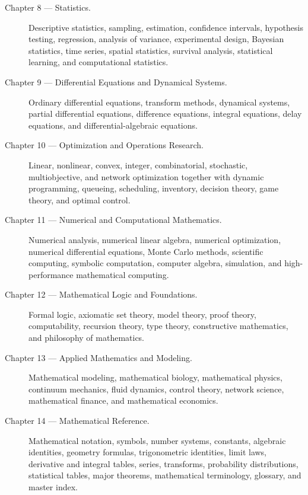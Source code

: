 \begin{description}
    \item[Chapter 8 --- Statistics.]
    Descriptive statistics, sampling, estimation, confidence intervals,
    hypothesis testing, regression, analysis of variance,
    experimental design, Bayesian statistics, time series,
    spatial statistics, survival analysis, statistical learning,
    and computational statistics.

    \item[Chapter 9 --- Differential Equations and Dynamical Systems.]
    Ordinary differential equations, transform methods,
    dynamical systems, partial differential equations,
    difference equations, integral equations, delay equations,
    and differential-algebraic equations.

    \item[Chapter 10 --- Optimization and Operations Research.]
    Linear, nonlinear, convex, integer, combinatorial, stochastic,
    multiobjective, and network optimization together with
    dynamic programming, queueing, scheduling, inventory,
    decision theory, game theory, and optimal control.

    \item[Chapter 11 --- Numerical and Computational Mathematics.]
    Numerical analysis, numerical linear algebra, numerical optimization,
    numerical differential equations, Monte Carlo methods,
    scientific computing, symbolic computation, computer algebra,
    simulation, and high-performance mathematical computing.

    \item[Chapter 12 --- Mathematical Logic and Foundations.]
    Formal logic, axiomatic set theory, model theory, proof theory,
    computability, recursion theory, type theory,
    constructive mathematics, and philosophy of mathematics.

    \item[Chapter 13 --- Applied Mathematics and Modeling.]
    Mathematical modeling, mathematical biology, mathematical physics,
    continuum mechanics, fluid dynamics, control theory,
    network science, mathematical finance, and mathematical economics.

    \item[Chapter 14 --- Mathematical Reference.]
    Mathematical notation, symbols, number systems, constants,
    algebraic identities, geometry formulas, trigonometric identities,
    limit laws, derivative and integral tables, series, transforms,
    probability distributions, statistical tables, major theorems,
    mathematical terminology, glossary, and master index.

\end{description}

